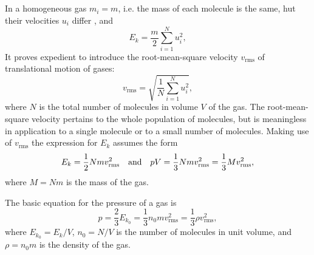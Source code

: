 \subsection{}\label{10.2.3} In a homogeneous gas $m_{i} = m$, i.e. the mass of each molecule is the same, hut their velocities $u_{i}$ differ , and
\begin{equation*}%
E_{k} = \frac{m}{2} \sum_{i=1}^{N} u_{i}^{2},
\end{equation*}
It proves expedient to introduce the root-mean-square velocity $v_{\textrm{rms}}$ of translational motion of gases:
\begin{equation*}%
v_{\textrm{rms}} = \sqrt{\frac{1}{N}\sum_{i=1}^{N}u_{i}^{2}},
\end{equation*}
where $N$ is the total number of molecules in volume $V$ of the gas. The root-mean-square velocity pertains to the whole population of molecules, but is meaningless in application to a single molecule or to a small number of molecules. Making use of $v_{\textrm{rms}}$ the expression for $E_{k}$ assumes the form
\begin{equation*}%
E_{k} = \frac{1}{2}Nm v_{\textrm{rms}}^{2} \qand pV = \frac{1}{3}Nm v_{\textrm{rms}}^{2} = \frac{1}{3}M v_{\textrm{rms}}^{2},
\end{equation*}
where $M = Nm$ is the mass of the gas.

The basic equation for the pressure of a gas is
\begin{equation*}%
p = \frac{2}{3} E_{k_{0}} = \frac{1}{3} n_{0}mv_{\textrm{rms}}^{2} = \frac{1}{3} \rho v_{\textrm{rms}}^{2},
\end{equation*}
where $E_{k_{0}}= E_{k}/V$, $n_{0}= N/V$ is the number of molecules in unit volume, and $\rho = n_{0}m$ is the density of the gas.


